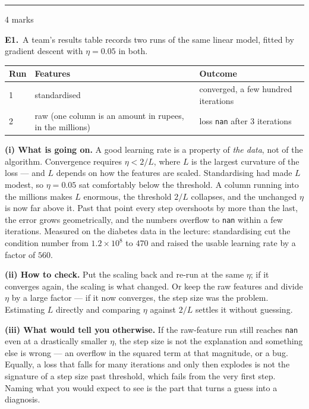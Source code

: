 \documentclass[10pt,a4paper]{article}
\newcommand{\parthead}[2]{\vspace{2pt}\noindent\rule{\linewidth}{0.4pt}\par\vspace{2pt}%
  \noindent{\bfseries Part #1}\hfill{\small #2}\par\vspace{1pt}}
\begin{document}
\parthead{E --- Reasoning}{4 marks}

\textbf{E1.}\ A team's results table records two runs of the same linear model, fitted by gradient descent with
$\eta = 0.05$ in both.

\vspace{2mm}
\begin{center}\small
\begin{tabular}{@{}lll@{}}
\hline
\rule{0pt}{11pt}\textbf{Run} & \textbf{Features} & \textbf{Outcome}\\[1pt]
\hline
\rule{0pt}{11pt}1 & standardised & converged, a few hundred iterations\\
2 & raw (one column is an amount in rupees, in the millions) & loss \texttt{nan} after 3 iterations\\[1pt]
\hline
\end{tabular}
\end{center}

\vspace{4pt}

\textbf{(i) What is going on.} A good learning rate is a property of \emph{the data}, not of the algorithm. Convergence requires $\eta < 2/L$, where $L$ is the largest curvature of the loss --- and $L$ depends on how the features are scaled. Standardising had made $L$ modest, so $\eta = 0.05$ sat comfortably below the threshold. A column running into the millions makes $L$ enormous, the threshold $2/L$ collapses, and the unchanged $\eta$ is now far above it. Past that point every step overshoots by more than the last, the error grows geometrically, and the numbers overflow to \texttt{nan} within a few iterations. Measured on the diabetes data in the lecture: standardising cut the condition number from $1.2 \times 10^{8}$ to $470$ and raised the usable learning rate by a factor of $560$.\par\vspace{1mm}\textbf{(ii) How to check.} Put the scaling back and re-run at the same $\eta$; if it converges again, the scaling is what changed. Or keep the raw features and divide $\eta$ by a large factor --- if it now converges, the step size was the problem. Estimating $L$ directly and comparing $\eta$ against $2/L$ settles it without guessing.\par\vspace{1mm}\textbf{(iii) What would tell you otherwise.} If the raw-feature run still reaches \texttt{nan} even at a drastically smaller $\eta$, the step size is not the explanation and something else is wrong --- an overflow in the squared term at that magnitude, or a bug. Equally, a loss that falls for many iterations and only then explodes is not the signature of a step size past threshold, which fails from the very first step. Naming what you would expect to see is the part that turns a guess into a diagnosis.
\end{document}
